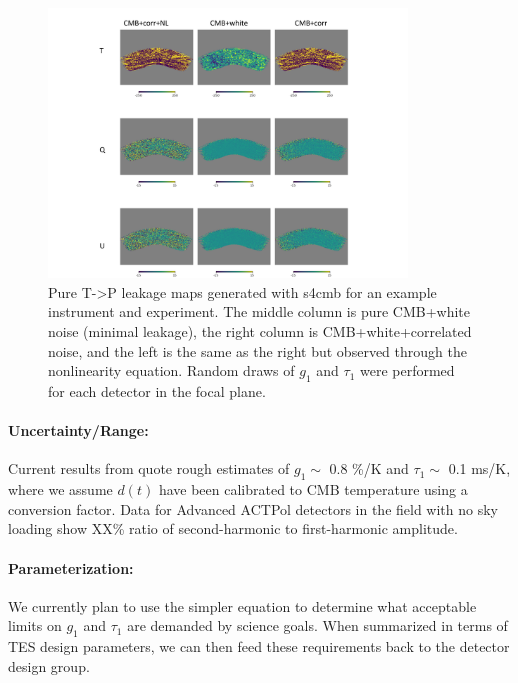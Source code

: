 \begin{figure}[h!]
\centering
\includegraphics[width=0.85\textwidth]{figures/040218_s4cmb_corr_NL.pdf}
\caption{Pure T->P leakage maps generated with s4cmb for an example instrument and experiment. The middle column is pure CMB+white noise (minimal leakage), the right column is CMB+white+correlated noise, and the left is the same as the right but observed through the nonlinearity equation. Random draws of $g_1$ and $\tau_1$ were performed for each detector in the focal plane.}
\end{figure}

\paragraph{Uncertainty/Range:}
Current results from \cite{PB1_WHWP} quote rough estimates of $g_1 \sim$ 0.8 \%/K and $\tau_1 \sim$ 0.1 ms/K, where we assume $d(t)$ have been calibrated to CMB temperature using a conversion factor. Data for Advanced ACTPol detectors in the field with no sky loading show XX\% ratio of second-harmonic to first-harmonic amplitude.

\paragraph{Parameterization:}
We currently plan to use the simpler equation to determine what acceptable limits on $g_1$ and $\tau_1$ are demanded by science goals. When summarized in terms of TES design parameters, we can then feed these requirements back to the detector design group.
